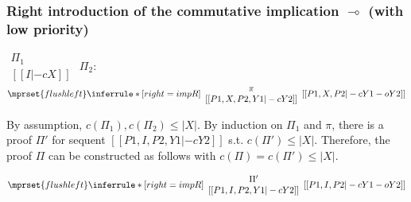 \subsubsection{Right introduction of the commutative implication $\multimap$ (with low priority)}
\begin{center}
  \scriptsize
  \begin{math}
    \begin{array}{c}
      \Pi_1 \\
      {[[I |-c X]]}
    \end{array}
  \end{math}
  \qquad\qquad
  $\Pi_2$:
  \begin{math}
    $$\mprset{flushleft}
    \inferrule* [right={\tiny impR}] {
      {
        \begin{array}{c}
          \pi \\
          {[[P1, X, P2, Y1 |-c Y2]]}
        \end{array}
      }
    }{[[P1, X, P2 |-c Y1 -o Y2]]}
  \end{math}
\end{center}
By assumption, $c(\Pi_1),c(\Pi_2)\leq |X|$. By induction on $\Pi_1$
and $\pi$, there is a proof $\Pi'$ for sequent
$[[P1, I, P2, Y1 |-c Y2]]$ s.t. $c(\Pi') \leq |X|$. Therefore, the
proof $\Pi$ can be constructed as follows with
$c(\Pi) = c(\Pi') \leq |X|$.
\begin{center}
  \scriptsize
  \begin{math}
    $$\mprset{flushleft}
    \inferrule* [right={\tiny impR}] {
      {
        \begin{array}{c}
          \Pi' \\
          {[[P1, I, P2, Y1 |-c Y2]]}
        \end{array}
      }
    }{[[P1, I, P2 |-c Y1 -o Y2]]}
  \end{math}
\end{center}



